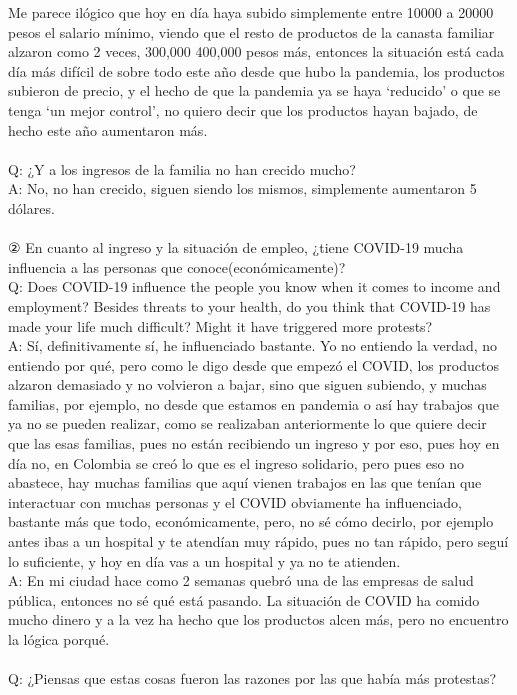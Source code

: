 \documentclass{phyasgn}\usepackage{nag}
\begin{document}
Me parece ilógico que hoy en día haya subido simplemente entre 10000 a 20000 pesos el salario mínimo, viendo que el resto de productos de la canasta familiar alzaron como 2 veces, 300,000 400,000 pesos más, entonces la situación está cada día más difícil de sobre todo este año desde que hubo la pandemia, los productos subieron de precio, y el hecho de que la pandemia ya se haya ‘reducido’ o que se tenga ‘un mejor control’, no quiero decir que los productos hayan bajado, de hecho este año aumentaron más.\\
\\
Q: ¿Y a los ingresos de la familia no han crecido mucho?\\
A: No, no han crecido, siguen siendo los mismos, simplemente aumentaron 5 dólares.\\
\\
② En cuanto al ingreso y la situación de empleo, ¿tiene COVID-19 mucha influencia a las personas que conoce(económicamente)?\\
	Q: Does COVID-19 influence the people you know when it comes to income and employment? Besides threats to your health, do you think that COVID-19 has made your life much difficult? Might it have triggered more protests?\\
A: Sí, definitivamente sí, he influenciado bastante. Yo no entiendo la verdad, no entiendo por qué, pero como le digo desde que empezó el COVID, los productos alzaron demasiado y no volvieron a bajar, sino que siguen subiendo, y muchas familias, por ejemplo, no desde que estamos en pandemia o así hay trabajos que ya no se pueden realizar, como se realizaban anteriormente lo que quiere decir que las esas familias, pues no están recibiendo un ingreso y por eso, pues hoy en día no, en Colombia se creó lo que es el ingreso solidario, pero pues eso no abastece, hay muchas familias que aquí vienen trabajos en las que tenían que interactuar con muchas personas y el COVID obviamente ha influenciado, bastante más que todo, económicamente, pero, no sé cómo decirlo, por ejemplo antes ibas a un hospital y te atendían muy rápido, pues no tan rápido, pero seguí lo suficiente, y hoy en día vas a un hospital y ya no te atienden.\\
A: En mi ciudad hace como 2 semanas quebró una de las empresas de salud pública, entonces no sé qué está pasando. La situación de COVID ha comido mucho dinero y a la vez ha hecho que los productos alcen más, pero no encuentro la lógica porqué.\\
\\
Q: ¿Piensas que estas cosas fueron las razones por las que había más protestas?\\
\end{document}
